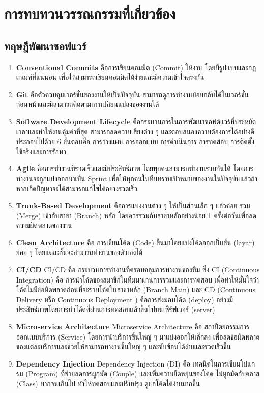 \chapter{การทบทวนวรรณกรรมที่เกี่ยวข้อง}
\label{chapter:literature-review}

\section{ทฤษฎีพัฒนาซอฟแวร์}

\begin{enumerate}
    \item \textbf{Conventional Commits} คือการเขียนคอมมิต (Commit) ให้งาน โดยมีรูปแบบและกฏเกณฑ์ที่แน่นอน เพื่อให้สามารถเขียนคอมมิตได้ง่ายและมีความเข้าใจตรงกัน \cite{CICDConventionalCommits}
    \item \textbf{Git} คือตัวควบคุมเวอร์ชั่นของงานให้เป็นปัจจุบัน สามารถดูการทำงานย้อมกลับได้ในเวอร์ชั่นก่อนหน้าและมีสามารถติดตามการเปลี่ยนแปลงของงานได้ \cite{BasicGit}
    \item \textbf{Software Development Lifecycle} คือกระบวนการในการพัฒนาซอฟต์แวร์ที่ประหยัดเวลาและทำให้งานคุ้มค่าที่สุด สามารถลดความเสี่ยงต่าง ๆ และตอบสนองความต้องการได้อย่างดี ประกอบไปด้วย 6 ขั้นตอนคือ การวางแผน การออกแบบ การดำเนินการ การทดสอบ การติดตั้งใช้จริงและการรักษา \cite{WhatIsSDLC}
    \item \textbf{Agile} คือการทำงานที่รวดเร็วและมีประสิทธิภาพ โดยทุกคนสามารถทำงานร่วมกันได้ โดยการทำงานจะถูกแบ่งออกมาเป็น Sprint เพื่อให้ทุกคนในทีมทราบเป้าหมายของงานในปัจจุบันแล้วถ้าหากเกิดปัญหาจะได้สามารถแก้ไขได้อย่างรวดเร็ว \cite{WhatIsAgile}
    \item \textbf{Trunk-Based Development} คือการแบ่งงานต่าง ๆ ให้เป็นส่วนเล็ก ๆ แล้วค่อย รวม (Merge) เข้ากับสาขา (Branch) หลัก โดยควรรวมกับสาขาหลักอย่างน้อย 1 ครั้งต่อวันเพื่อลดความผิดพลาดของงาน \cite{TrunkBasedDevelopment}
    \item \textbf{Clean Architecture} คือ การเขียนโค้ด (Code) ขึ้นมาโดยแบ่งโค้ดออกเป็นชั้น (layar) ย่อย ๆ โดยแต่ละชั้นจะสามารถทำงานของตัวเองได้ 
    \item \textbf{CI/CD} CI/CD คือ กระบวนการทำงานที่ครอบคลุมการทำงานของทีม ซึ่ง CI (Continuous Integration) คือ การนำโค้ดของสมาชิกในทีมมาผ่านการรวมและการทดสอบ เพื่อทำให้มั่นใจว่าโค้ดไม่มีข้อผิดพลาดก่อนที่จะรวมโค้ดในสาขาหลัก (Branch Main) และ CD (Continuous Delivery หรือ Continuous Deployment ) คือการส่งมอบโค้ด (deploy) อย่างมีประสิทธิภาพโดยการนำโค้ดที่ผ่านการทดสอบแล้วขึ้นไปบนเซิร์ฟเวอร์ (server)
    \item \textbf{Microservice Architecture} Microservice Architecture คือ สถาปัตยกรรมการออกแบบบริการ (Service) โดยการนำบริการชิ้นใหญ่ ๆ มาแบ่งออกให้เล็กลง เพื่อลดข้อผิดพลาดของแต่ละบริการและช่วยให้สามารถทำงานชิ้นใหญ่ ๆ และซับซ้อนได้ง่ายและรวดเร็วขึ้น
    \item \textbf{Dependency Injection} Dependency Injection (DI) คือ เทคนิคในการเขียนโปแกรม (Program) ที่ช่วยลดการผูกมัด (Couple) และเพิ่มความยืดหยุ่นของโค้ด ไม่ผูกมัดกับคลาส (Class) มากจนเกินไป ทำให้ทดสอบและปรับปรุง ดูแลโค้ดได้ง่ายมากขึ้น
\end{enumerate}

